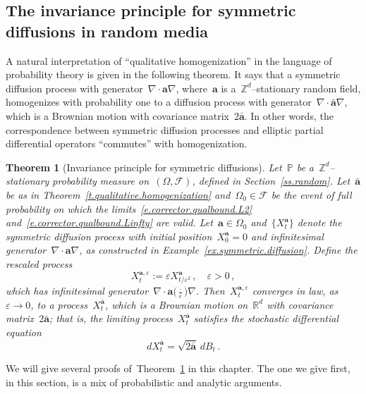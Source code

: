 \documentclass[11pt,twoside]{article} %
\numberwithin{equation}{section}
\newtheorem{theorem}{Theorem}[section]
\theoremstyle{definition}
\newcommand*{\Zd}{\ensuremath{\mathbb{Z}^d}}
\newcommand*{\Rd}{\ensuremath{\mathbb{R}^d}}
\newcommand{\eps}{\varepsilon}
\newcommand{\ep}{\eps}
\renewcommand{\a}{\mathbf{a}}
\newcommand{\ahom}{\bar{\a}}
\newcommand{\F}{\mathcal{F}}
\renewcommand{\P}{\mathbb{P}}
\begin{document}
\subsection{The invariance principle for symmetric diffusions in random media}
\label{ss.invariance}



A natural interpretation of ``qualitative homogenization'' in the language of probability theory is given in the following theorem. It says that a symmetric diffusion process with generator~$\nabla \cdot\a\nabla$, where~$\a$ is a~$\Zd$--stationary random field, homogenizes with probability one to a diffusion process with generator~$\nabla\cdot \ahom \nabla$, which is a Brownian motion with covariance matrix~$2\ahom$. In other words, the correspondence between symmetric diffusion processes and elliptic partial differential operators ``commutes'' with homogenization. 


\begin{theorem}[Invariance principle for symmetric diffusions]
\label{t.invariance}
Let~$\P$ be a~$\Zd$--stationary probability measure on~$(\Omega,\F)$, defined in Section~\ref{ss.random}. Let~$\ahom$ be as in Theorem~\ref{t.qualitative.homogenization} and~$\Omega_0 \in \F$ be the event of full probability on which the limits~\eqref{e.corrector.qualbound.L2} and~\eqref{e.corrector.qualbound.Linfty} are valid. 
Let~$\a\in \Omega_0$ and~$\{ X_t^{\a}\}$ denote the symmetric diffusion process with initial position~$X_0^{\a}=0$ and infinitesimal generator~$\nabla \cdot \a\nabla$, as constructed in Example~\ref{ex.symmetric.diffusion}.  
Define the rescaled process 
\begin{equation*}
X^{\a,\ep}_t := \ep X^{\a}_{ t/{\ep^2} }\,, \quad \ep > 0\,,
\end{equation*}
which has infinitesimal generator~$\nabla \cdot \a\bigl( \tfrac \cdot \ep \bigr) \nabla$. Then~$X^{\a,\ep}_t$ converges in law, as~$\ep \to 0$, to a process~$X^{\ahom}_t$, which is a Brownian motion on~$\Rd$ with covariance matrix~$2\ahom$; that is, the limiting process~$X^{\ahom}_t$ satisfies the stochastic differential equation
\begin{equation*}
dX^{\ahom}_t = \sqrt{2\ahom}\, dB_t\,.
\end{equation*}
\end{theorem}


We will give several proofs of~Theorem~\ref{t.invariance} in this chapter. 
The one we give first, in this section, is a mix of probabilistic and analytic arguments. 
\end{document}
